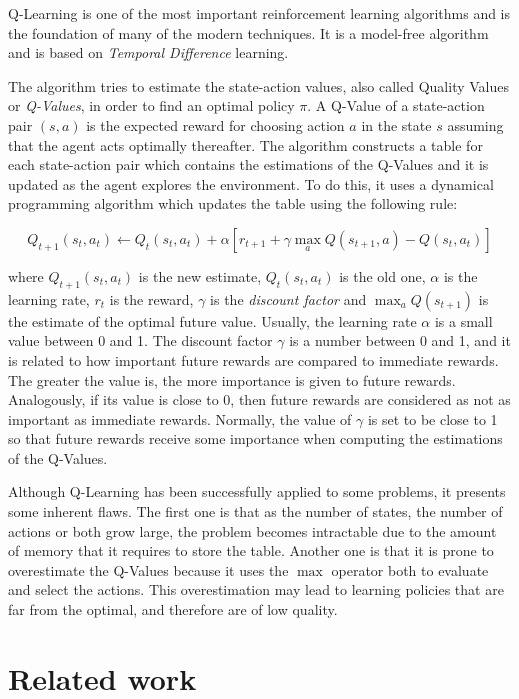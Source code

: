 \documentclass{article}
\begin{document}
Q-Learning is one of the most important reinforcement learning algorithms and is the foundation of many
of the modern techniques. It is a model-free algorithm and is based on \emph{Temporal Difference}
learning.

The algorithm tries to estimate the state-action values, also called Quality Values or \emph{Q-Values},
in order to find an optimal policy $\pi$. A Q-Value of a state-action pair $(s, a)$ is the expected
reward for choosing action $a$ in the state $s$ assuming that the agent acts optimally thereafter.
The algorithm constructs a table for each state-action pair which contains the estimations of the
Q-Values and it is updated as the agent explores the environment. To do this, it uses a dynamical
programming algorithm which updates the table using the following rule:

\begin{equation}
\label{bellman}
      Q_{t+1}(s_t, a_t) \leftarrow Q_t(s_t, a_t) + \alpha \left[ r_{t+1} + \gamma \max_{a} Q(s_{t+1}, a) - Q(s_t, a_t) \right]
\end{equation}


where $Q_{t+1}(s_t, a_t)$ is the new estimate, $Q_t(s_t, a_t)$ is the old one, $\alpha$ is the
learning rate, $r_t$ is the reward, $\gamma$ is the \emph{discount factor} and $\max_{a} Q(s_{t+1})$
is the estimate of the optimal future value. Usually, the learning rate $\alpha$ is a small value
between 0 and 1. The discount factor $\gamma$ is a number between 0 and 1, and it is related to how
important future rewards are compared to immediate rewards. The greater the value is, the more
importance is given to future rewards. Analogously, if its value is close to 0, then future rewards
are considered as not as important as immediate rewards. Normally, the value of $\gamma$ is set
to be close to 1 so that future rewards receive some importance when computing the estimations of the
Q-Values.

Although Q-Learning has been successfully applied to some problems, it presents some inherent flaws.
The first one is that as the number of states, the number of actions or both grow large, the problem
becomes intractable due to the amount of memory that it requires to store the table. Another one
is that it is prone to overestimate the Q-Values because it uses the $\max$ operator both to
evaluate and select the actions. This overestimation may lead to learning policies that are far
from the optimal, and therefore are of low quality.

\section{Related work}
\end{document}
